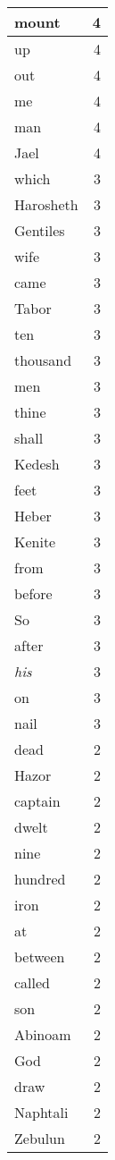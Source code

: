 \begin{center}
\begin{longtable}{l|r}
mount & 4\\ \hline 
up & 4\\ \hline 
out & 4\\ \hline 
me & 4\\ \hline 
man & 4\\ \hline 
Jael & 4\\ \hline 
which & 3\\ \hline 
Harosheth & 3\\ \hline 
Gentiles & 3\\ \hline 
wife & 3\\ \hline 
came & 3\\ \hline 
Tabor & 3\\ \hline 
ten & 3\\ \hline 
thousand & 3\\ \hline 
men & 3\\ \hline 
thine & 3\\ \hline 
shall & 3\\ \hline 
Kedesh & 3\\ \hline 
feet & 3\\ \hline 
Heber & 3\\ \hline 
Kenite & 3\\ \hline 
from & 3\\ \hline 
before & 3\\ \hline 
So & 3\\ \hline 
after & 3\\ \hline 
\emph{his} & 3\\ \hline 
on & 3\\ \hline 
nail & 3\\ \hline 
dead & 2\\ \hline 
Hazor & 2\\ \hline 
captain & 2\\ \hline 
dwelt & 2\\ \hline 
nine & 2\\ \hline 
hundred & 2\\ \hline 
iron & 2\\ \hline 
at & 2\\ \hline 
between & 2\\ \hline 
called & 2\\ \hline 
son & 2\\ \hline 
Abinoam & 2\\ \hline 
God & 2\\ \hline 
draw & 2\\ \hline 
Naphtali & 2\\ \hline 
Zebulun & 2\\ \hline 

\end{longtable}
\end{center}
